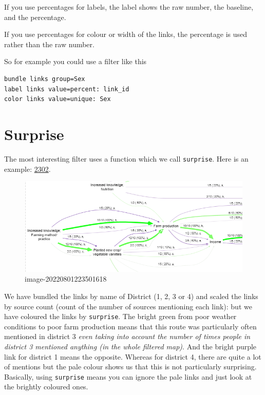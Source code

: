 \documentclass[
]{book}
\begin{document}
If you use percentages for labels, the label shows the raw number, the baseline, and the percentage.

If you use percentages for colour or width of the links, the percentage is used rather than the raw number.

So for example you could use a filter like this

\begin{verbatim}
bundle links group=Sex
label links value=percent: link_id
color links value=unique: Sex
\end{verbatim}

\hypertarget{xsurprise}{%
\section{Surprise}\label{xsurprise}}

The most interesting filter uses a function which we call \texttt{surprise}. Here is an example: \href{https://causalmap.shinyapps.io/CausalMap2?s=2302}{2302}.

\begin{figure}
\centering
\includegraphics{_assets/image-20220801223501618.png}
\caption{image-20220801223501618}
\end{figure}

We have bundled the links by name of District (1, 2, 3 or 4) and scaled the links by source count (count of the number of sources mentioning each link): but we have coloured the links by \texttt{surprise}. The bright green from poor weather conditions to poor farm production means that this route was particularly often mentioned in district 3 \emph{even taking into account the number of times people in district 3 mentioned anything (in the whole filtered map)}. And the bright purple link for district 1 means the opposite. Whereas for district 4, there are quite a lot of mentions but the pale colour shows us that this is not particularly surprising. Basically, using \texttt{surprise} means you can ignore the pale links and just look at the brightly coloured ones.
\end{document}
